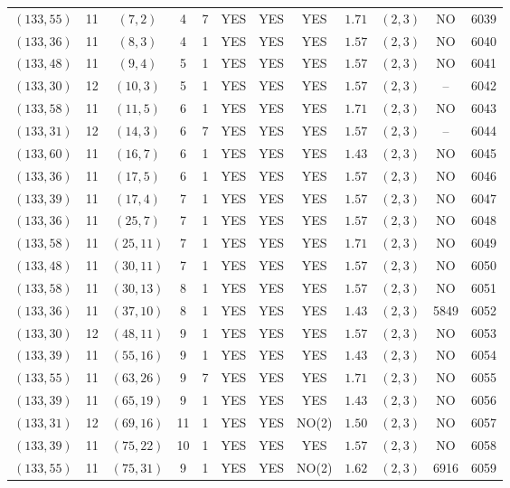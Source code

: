 \begin{longtable}{|c|c|c|c|c|c|c|c|c|c|c|c|}
$(133,55)$ & 11 & $(7,2)$ & 4 & 7 & YES & YES & YES & $1.71$ & $(2,3)$ & NO & 6039\\
$(133,36)$ & 11 & $(8,3)$ & 4 & 1 & YES & YES & YES & $1.57$ & $(2,3)$ & NO & 6040\\
$(133,48)$ & 11 & $(9,4)$ & 5 & 1 & YES & YES & YES & $1.57$ & $(2,3)$ & NO & 6041\\
$(133,30)$ & 12 & $(10,3)$ & 5 & 1 & YES & YES & YES & $1.57$ & $(2,3)$ & -- & 6042\\
$(133,58)$ & 11 & $(11,5)$ & 6 & 1 & YES & YES & YES & $1.71$ & $(2,3)$ & NO & 6043\\
$(133,31)$ & 12 & $(14,3)$ & 6 & 7 & YES & YES & YES & $1.57$ & $(2,3)$ & -- & 6044\\
$(133,60)$ & 11 & $(16,7)$ & 6 & 1 & YES & YES & YES & $1.43$ & $(2,3)$ & NO & 6045\\
$(133,36)$ & 11 & $(17,5)$ & 6 & 1 & YES & YES & YES & $1.57$ & $(2,3)$ & NO & 6046\\
$(133,39)$ & 11 & $(17,4)$ & 7 & 1 & YES & YES & YES & $1.57$ & $(2,3)$ & NO & 6047\\
$(133,36)$ & 11 & $(25,7)$ & 7 & 1 & YES & YES & YES & $1.57$ & $(2,3)$ & NO & 6048\\
$(133,58)$ & 11 & $(25,11)$ & 7 & 1 & YES & YES & YES & $1.71$ & $(2,3)$ & NO & 6049\\
$(133,48)$ & 11 & $(30,11)$ & 7 & 1 & YES & YES & YES & $1.57$ & $(2,3)$ & NO & 6050\\
$(133,58)$ & 11 & $(30,13)$ & 8 & 1 & YES & YES & YES & $1.57$ & $(2,3)$ & NO & 6051\\
$(133,36)$ & 11 & $(37,10)$ & 8 & 1 & YES & YES & YES & $1.43$ & $(2,3)$ & 5849 & 6052\\
$(133,30)$ & 12 & $(48,11)$ & 9 & 1 & YES & YES & YES & $1.57$ & $(2,3)$ & NO & 6053\\
$(133,39)$ & 11 & $(55,16)$ & 9 & 1 & YES & YES & YES & $1.43$ & $(2,3)$ & NO & 6054\\
$(133,55)$ & 11 & $(63,26)$ & 9 & 7 & YES & YES & YES & $1.71$ & $(2,3)$ & NO & 6055\\
$(133,39)$ & 11 & $(65,19)$ & 9 & 1 & YES & YES & YES & $1.43$ & $(2,3)$ & NO & 6056\\
$(133,31)$ & 12 & $(69,16)$ & 11 & 1 & YES & YES & NO(2) & $1.50$ & $(2,3)$ & NO & 6057\\
$(133,39)$ & 11 & $(75,22)$ & 10 & 1 & YES & YES & YES & $1.57$ & $(2,3)$ & NO & 6058\\
$(133,55)$ & 11 & $(75,31)$ & 9 & 1 & YES & YES & NO(2) & $1.62$ & $(2,3)$ & 6916 & 6059\\

\end{longtable}
